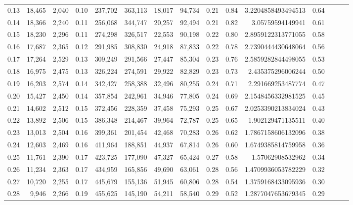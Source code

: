 \begin{tabular}{rrrrrrrrrrrrrrr}
0.13 &  18,465 &  2,040 &  0.10 &  237,702 &  363,113 &   18,017 &   94,734 &  0.21 &  0.84 &    3.2204858493494513 &      0.64 \\
0.14 &  18,366 &  2,240 &  0.11 &  256,068 &  344,747 &   20,257 &   92,494 &  0.21 &  0.82 &      3.05759594149941 &      0.61 \\
0.15 &  18,230 &  2,296 &  0.11 &  274,298 &  326,517 &   22,553 &   90,198 &  0.22 &  0.80 &    2.8959122313771055 &      0.58 \\
0.16 &  17,687 &  2,365 &  0.12 &  291,985 &  308,830 &   24,918 &   87,833 &  0.22 &  0.78 &    2.7390444430648064 &      0.56 \\
0.17 &  17,264 &  2,529 &  0.13 &  309,249 &  291,566 &   27,447 &   85,304 &  0.23 &  0.76 &    2.5859282844498055 &      0.53 \\
0.18 &  16,975 &  2,475 &  0.13 &  326,224 &  274,591 &   29,922 &   82,829 &  0.23 &  0.73 &     2.435375296006244 &      0.50 \\
0.19 &  16,203 &  2,574 &  0.14 &  342,427 &  258,388 &   32,496 &   80,255 &  0.24 &  0.71 &     2.291669253487774 &      0.47 \\
0.20 &  15,427 &  2,450 &  0.14 &  357,854 &  242,961 &   34,946 &   77,805 &  0.24 &  0.69 &    2.1548456332981525 &      0.45 \\
0.21 &  14,602 &  2,512 &  0.15 &  372,456 &  228,359 &   37,458 &   75,293 &  0.25 &  0.67 &    2.0253390213834024 &      0.43 \\
0.22 &  13,892 &  2,506 &  0.15 &  386,348 &  214,467 &   39,964 &   72,787 &  0.25 &  0.65 &     1.902129471135511 &      0.40 \\
0.23 &  13,013 &  2,504 &  0.16 &  399,361 &  201,454 &   42,468 &   70,283 &  0.26 &  0.62 &    1.7867158606132096 &      0.38 \\
0.24 &  12,603 &  2,469 &  0.16 &  411,964 &  188,851 &   44,937 &   67,814 &  0.26 &  0.60 &    1.6749385814759958 &      0.36 \\
0.25 &  11,761 &  2,390 &  0.17 &  423,725 &  177,090 &   47,327 &   65,424 &  0.27 &  0.58 &      1.57062908532962 &      0.34 \\
0.26 &  11,234 &  2,363 &  0.17 &  434,959 &  165,856 &   49,690 &   63,061 &  0.28 &  0.56 &    1.4709936053782229 &      0.32 \\
0.27 &  10,720 &  2,255 &  0.17 &  445,679 &  155,136 &   51,945 &   60,806 &  0.28 &  0.54 &    1.3759168433095936 &      0.30 \\
0.28 &   9,946 &  2,266 &  0.19 &  455,625 &  145,190 &   54,211 &   58,540 &  0.29 &  0.52 &    1.2877047653679345 &      0.29 \\

\end{tabular}
